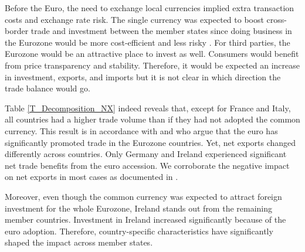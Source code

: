 \documentclass[12pt]{article}
\newcommand{\annote}[1]{\parbox{\textwidth}{\renewcommand{\baselinestretch}{1.0}\vspace{12pt} \small Notes: #1}}
\begin{document}
Before the Euro, the need to exchange local currencies implied extra transaction costs and exchange rate risk. The single currency was expected to boost cross-border trade and investment between the member states since doing business in the Eurozone would be more cost-efficient and less risky \cite{DeGrauwe2020}. For third parties, the Eurozone would be an attractive place to invest as well. Consumers would benefit from price transparency and stability. Therefore, it would be expected an increase in investment, exports, and imports but it is not clear in which direction the trade balance would go.

Table \ref{T_Decomposition_NX} indeed reveals that, except for France and Italy, all countries had a higher trade volume than if they had not adopted the common currency. This result is in accordance with \cite{Baldwin2008} and \cite{Schmitz2011} who argue that the euro has significantly promoted trade in the Eurozone countries. Yet, net exports changed differently across countries. Only Germany and Ireland experienced significant net trade benefits from the euro accession. We corroborate the negative impact on net exports in most cases as documented in \cite{Hope2016}. 

Moreover, even though the common currency was expected to attract foreign investment for the whole Eurozone, Ireland stands out from the remaining member countries. Investment in Ireland increased significantly because of the euro adoption. Therefore, country-specific characteristics have significantly shaped the impact across member states.   


\end{document}
